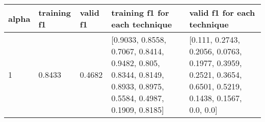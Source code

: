 \documentclass{article}%
\begin{document}
\begin{longtable}{l l l l l}%
\hline%
alpha&training f1&valid f1&training f1 for each technique&valid f1 for each technique\\%
\hline%
\endhead%
\hline%
1&0.8433&0.4682&{[}0.9033, 0.8558, 0.7067, 0.8414, 0.9482, 0.805, 0.8344, 0.8149, 0.8933, 0.8975, 0.5584, 0.4987, 0.1909, 0.8185{]}&{[}0.111, 0.2743, 0.2056, 0.0763, 0.1977, 0.3959, 0.2521, 0.3654, 0.6501, 0.5219, 0.1438, 0.1567, 0.0, 0.0{]}\\%
\hline%
\end{longtable}%
\end{document}
